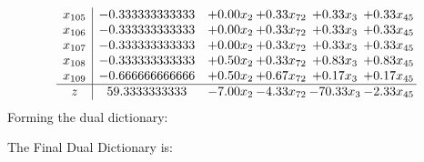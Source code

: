 \documentclass[8pt]{article}
\begin{document}
\[\begin{array}{c| c c@{\hskip 2pt} c@{\hskip 2pt} c@{\hskip 2pt} c@{\hskip 2pt} }
 x_{105}   &  -0.333333333333 & +  0.00 x_{2} & +  0.33 x_{72} & +  0.33 x_{3} & +  0.33 x_{45}\\
 x_{106}   &  -0.333333333333 & +  0.00 x_{2} & +  0.33 x_{72} & +  0.33 x_{3} & +  0.33 x_{45}\\
 x_{107}   &  -0.333333333333 & +  0.00 x_{2} & +  0.33 x_{72} & +  0.33 x_{3} & +  0.33 x_{45}\\
 x_{108}   &  -0.333333333333 & +  0.50 x_{2} & +  0.33 x_{72} & +  0.83 x_{3} & +  0.83 x_{45}\\
 x_{109}   &  -0.666666666666 & +  0.50 x_{2} & +  0.67 x_{72} & +  0.17 x_{3} & +  0.17 x_{45}\\
\hline
z    &  59.3333333333 & -7.00 x_{2} & -4.33 x_{72} & -70.33 x_{3} & -2.33 x_{45}\\
\end{array}\]
Forming the dual dictionary:

The Final Dual Dictionary is: 
\end{document}
